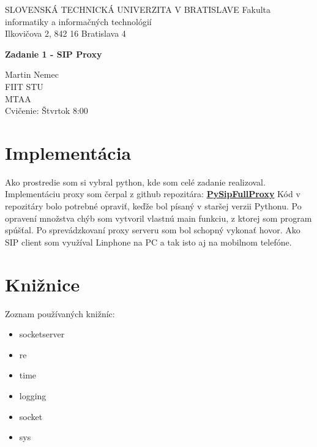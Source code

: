 \documentclass[12pt, oneside]{article}
\begin{document}
\thispagestyle{empty}
\begin{center}
\begin{minipage}{0.75\linewidth}
\centering
\uppercase{Slovenská Technická univerzita v Bratislave}
Fakulta informatiky a informačných technológií\\
Ilkovičova 2, 842 16 Bratislava 4\\
\vspace{7cm}
{\Large \textbf{Zadanie 1 - SIP Proxy} \par}
\vspace{7cm}
\begin{flushright}
{\Large Martin Nemec \\ FIIT STU \\ MTAA\\ Cvičenie: Štvrtok 8:00\\}
\end{flushright}
\end{minipage}
\end{center}

\newpage

\section{Implementácia}
Ako prostredie som si vybral python, kde som celé zadanie realizoval. 
Implementáciu proxy som čerpal z github repozitára: \textbf{\href{https://github.com/tirfil/PySipFullProxy}{PySipFullProxy}} 
\newline
Kód v repozitáry bolo potrebné opraviť, keďže bol písaný v staršej verzii Pythonu.
Po opravení množstva chýb som vytvoril vlastnú main funkciu, z ktorej som program spúšťal. Po sprevádzkovaní proxy serveru som bol schopný vykonať hovor. Ako SIP client som využíval Linphone na PC a tak isto aj na mobilnom telefóne.
\section{Knižnice}
Zoznam používaných knižníc:
\begin{itemize}
  \item socketserver
  \item re
  \item time
  \item logging
  \item socket
  \item sys
\end{itemize}
\end{document}
